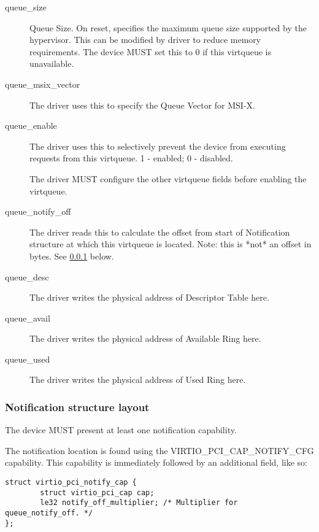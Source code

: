 \begin{description}
\item[queue_size]
        Queue Size.  On reset, specifies the maximum queue size supported by
        the hypervisor. This can be modified by driver to reduce memory requirements.
        The device MUST set this to 0 if this virtqueue is unavailable.

\item[queue_msix_vector]
        The driver uses this to specify the Queue Vector for MSI-X.

\item[queue_enable]
        The driver uses this to selectively prevent the device from executing requests from this virtqueue.
        1 - enabled; 0 - disabled.

        The driver MUST configure the other virtqueue fields before enabling
        the virtqueue.

\item[queue_notify_off]
        The driver reads this to calculate the offset from start of Notification structure at
        which this virtqueue is located.
        Note: this is *not* an offset in bytes. See \ref{sec:Virtio Transport Options / Virtio Over PCI Bus / PCI Device Layout / Notification capability} below.

\item[queue_desc]
        The driver writes the physical address of Descriptor Table here.

\item[queue_avail]
        The driver writes the physical address of Available Ring here.

\item[queue_used]
        The driver writes the physical address of Used Ring here.
\end{description}

\subsubsection{Notification structure layout}\label{sec:Virtio Transport Options / Virtio Over PCI Bus / PCI Device Layout / Notification capability}

The device MUST present at least one notification capability.

The notification location is found using the VIRTIO_PCI_CAP_NOTIFY_CFG
capability.  This capability is immediately followed by an additional
field, like so:

\begin{lstlisting}
struct virtio_pci_notify_cap {
        struct virtio_pci_cap cap;
        le32 notify_off_multiplier; /* Multiplier for queue_notify_off. */
};
\end{lstlisting}

